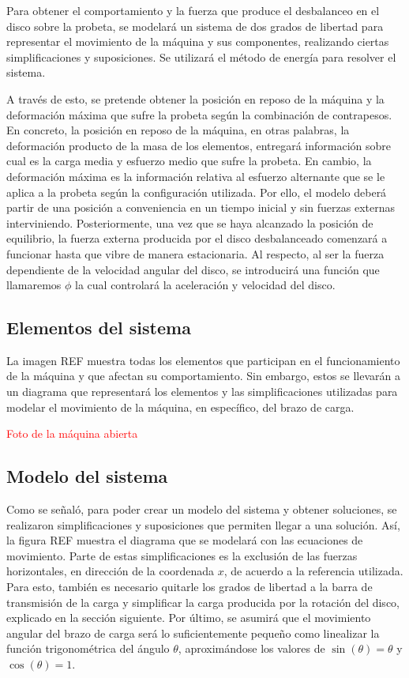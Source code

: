 Para obtener el comportamiento y la fuerza que produce el desbalanceo en el disco sobre la probeta, se modelará un sistema de dos grados de libertad para representar el movimiento de la máquina y sus componentes, realizando ciertas simplificaciones y suposiciones. Se utilizará el método de energía para resolver el sistema.

A través de esto, se pretende obtener la posición en reposo de la máquina y la deformación máxima que sufre la probeta según la combinación de contrapesos. En concreto, la posición en reposo de la máquina, en otras palabras, la deformación producto de la masa de los elementos, entregará información sobre cual es la carga media y esfuerzo medio que sufre la probeta. En cambio, la deformación máxima es la información relativa al esfuerzo alternante que se le aplica a la probeta según la configuración utilizada. Por ello, el modelo deberá partir de una posición a conveniencia en un tiempo inicial y sin fuerzas externas interviniendo. Posteriormente, una vez que se haya alcanzado la posición de equilibrio, la fuerza externa producida por el disco desbalanceado comenzará a funcionar hasta que vibre de manera estacionaria. Al respecto, al ser la fuerza dependiente de la velocidad angular del disco, se introducirá una función que llamaremos $\phi$ la cual controlará la aceleración y velocidad del disco.

\subsection{Elementos del sistema}
La imagen REF muestra todas los elementos que participan en el funcionamiento de la máquina y que afectan su comportamiento. Sin embargo, estos se llevarán a un diagrama que representará los elementos y las simplificaciones utilizadas para modelar el movimiento de la máquina, en específico, del brazo de carga.  

\textcolor{red}{Foto de la máquina abierta}

\subsection{Modelo del sistema}
\label{sec:mod_sist}
Como se señaló, para poder crear un modelo del sistema y obtener soluciones, se realizaron simplificaciones y suposiciones que permiten llegar a una solución. Así, la figura REF muestra el diagrama que se modelará con las ecuaciones de movimiento. Parte de estas simplificaciones es la exclusión de las fuerzas horizontales, en dirección de la coordenada $x$, de acuerdo a la referencia utilizada. Para esto, también es necesario quitarle los grados de libertad a la barra de transmisión de la carga y simplificar la carga producida por la rotación del disco, explicado en la sección siguiente. Por último, se asumirá que el movimiento angular del brazo de carga será lo suficientemente pequeño como linealizar la función trigonométrica del ángulo $\theta$, aproximándose los valores de $\sin(\theta) = \theta$ y $\cos(\theta)=1$.

